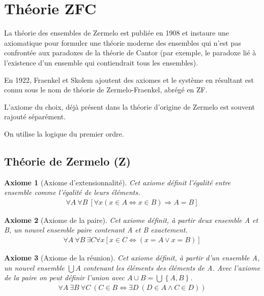 \documentclass[10pt,a4paper]{article}
\newtheorem{axiom}{Axiome}[section]
\begin{document}
{\appendix

\section{Théorie ZFC}
\label{ZFC}
La théorie des ensembles de Zermelo est publiée en 1908 et instaure une axiomatique pour formuler une théorie moderne des ensembles qui n'est pas confrontée aux paradoxes de la théorie de Cantor (par exemple, le paradoxe lié à l'existence d'un ensemble qui contiendrait tous les ensembles).

En 1922, Fraenkel et Skolem ajoutent des axiomes et le système en résultant est connu sous le nom de théorie de Zermelo-Fraenkel, abrégé en ZF.

L'axiome du choix, déjà présent dans la théorie d'origine de Zermelo est souvent rajouté séparément.

On utilise la logique du premier ordre.

\subsection{Théorie de Zermelo (Z)}

\begin{axiom}[Axiome d'extensionnalité] Cet axiome définit l'égalité entre ensemble comme l'égalité de leurs éléments.
\begin{align}
\forall A\ \forall B \
\left[ 
\forall x \left( x \in A \Leftrightarrow x \in B  \right) \Rightarrow A = B
\right] 
\end{align}
\end{axiom}

\begin{axiom}[Axiome de la paire] Cet axiome définit, à partir deux ensemble A et B, un nouvel ensemble paire contenant A et B exactement.
\begin{align}
\forall A \ \forall B \ \exists C \forall x \left[ x \in C \Leftrightarrow \left( x = A \vee x = B \right) \right]
\end{align}
\end{axiom}

\begin{axiom}[Axiome de la réunion] Cet axiome définit, à partir d'un ensemble A, un nouvel ensemble $\bigcup A$ contenant les éléments des éléments de A. Avec l'axiome de la paire on peut définir l'union avec $A \cup B = \bigcup \left\{A, B\right\}$.
\begin{align}
\forall A\ \exists B\ \forall C\ \left( C\in B \Leftrightarrow \exists D\ \left( D\in A \wedge C\in D \right) \right)
\end{align}
\end{axiom}


}
\end{document}
